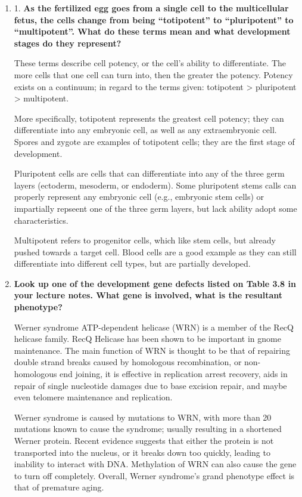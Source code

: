 \documentclass[basic]{inVerba-notes}
\begin{document}
  \begin{enumerate}
    \item 1. \textbf{As the fertilized egg goes from a single cell to the multicellular fetus, the cells change from being “totipotent” to “pluripotent” to “multipotent”. What do these terms mean and what development stages do they represent?}
    
    These terms describe cell potency, or the cell's ability to differentiate. The more cells that one cell can turn into, then the greater the potency. Potency exists on a continuum; in regard to the terms given: totipotent > pluripotent > multipotent.

    More specifically, totipotent represents the greatest cell potency; they can differentiate into any embryonic cell, as well as any extraembryonic cell. Spores and zygote are examples of totipotent cells; they are the first stage of development.

    Pluripotent cells are cells that can differentiate into any of the three germ layers (ectoderm, mesoderm, or endoderm). Some pluripotent stems calls can properly represent any embryonic cell (e.g., embryonic stem cells) or impartially repseent one of the three germ layers, but lack ability adopt some characteristics.  

    Multipotent refers to progenitor cells, which like stem cells, but already pushed towards a target cell. Blood cells are a good example as they can still differentiate into different cell types, but are partially developed. 
    
    \item \textbf{Look up one of the development gene defects listed on Table 3.8 in your lecture notes. What gene is involved, what is the resultant phenotype?} 
    
    Werner syndrome ATP-dependent helicase (WRN) is a member of the RecQ  helicase family. RecQ Helicase has been shown to be important in gnome maintenance. The main function of WRN is thought to be that of repairing double strand breaks caused by homologous recombination, or non-homologous end joining, it is effective in replication arrest recovery, aids in repair of single nucleotide damages due to base excision repair, and maybe even telomere maintenance and replication. 


    Werner syndrome is caused by mutations to WRN, with more than 20 mutations known to cause the syndrome; usually resulting in a shortened Werner protein. Recent evidence suggests that either the protein is not transported into the nucleus, or it breaks down too quickly, leading to inability to interact with DNA\@. Methylation of WRN can also cause the gene to turn off completely. Overall, Werner syndrome's grand phenotype effect is that of premature aging.


\end{enumerate}
\end{document}
